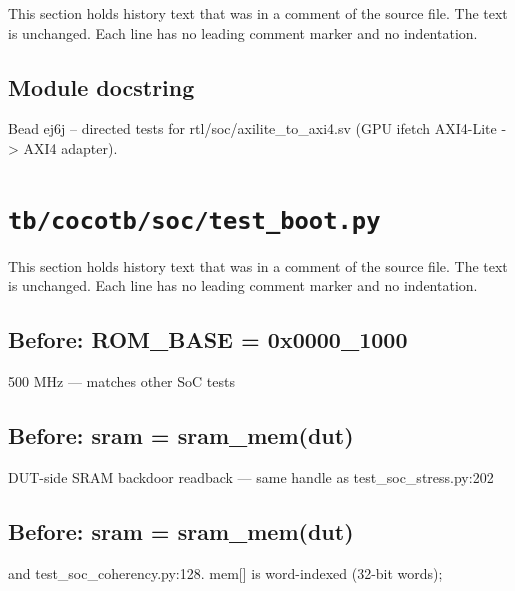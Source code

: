 This section holds history text that was in a comment of the source file. The text is unchanged. Each line has no leading comment marker and no indentation.

\begin{record}

\subsection*{Module docstring}

\begin{textblock}
Bead ej6j -- directed tests for rtl/soc/axilite_to_axi4.sv (GPU ifetch AXI4-Lite -> AXI4 adapter).
\end{textblock}

\end{record}

\section{\texttt{tb/cocotb/soc/test\_boot.py}}\label{cr:suite:soc-test-boot}

This section holds history text that was in a comment of the source file. The text is unchanged. Each line has no leading comment marker and no indentation.

\begin{record}

\subsection*{Before: ROM\_BASE        = 0x0000\_1000}

\begin{textblock}
500 MHz — matches other SoC tests
\end{textblock}

\subsection*{Before: sram = sram\_mem(dut)}

\begin{textblock}
DUT-side SRAM backdoor readback — same handle as test_soc_stress.py:202
\end{textblock}

\subsection*{Before: sram = sram\_mem(dut)}

\begin{textblock}
and test_soc_coherency.py:128.  mem[] is word-indexed (32-bit words);
\end{textblock}

\end{record}


